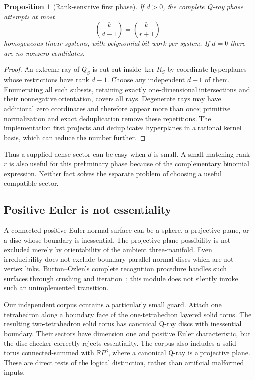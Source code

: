 \documentclass[11pt]{article}
\newtheorem{proposition}[theorem]{Proposition}
\theoremstyle{definition}
\theoremstyle{remark}
\newcommand{\R}{\mathbb R}
\begin{document}
\begin{proposition}[Rank-sensitive first phase]
\label{prop:qcount}
If $d>0$, the complete Q-ray phase attempts at most
\begin{equation}
 \binom{k}{d-1}=\binom{k}{r+1}
 \label{eq:qwork}
\end{equation}
homogeneous linear systems, with polynomial bit work per system. If $d=0$
there are no nonzero candidates.
\end{proposition}
\begin{proof}
An extreme ray of $Q_S$ is cut out inside $\ker R_S$ by coordinate
hyperplanes whose restrictions have rank $d-1$. Choose any independent
$d-1$ of them. Enumerating all such subsets, retaining exactly one-dimensional
intersections and their nonnegative orientation, covers all rays. Degenerate
rays may have additional zero coordinates and therefore appear more than
once; primitive normalization and exact deduplication remove these repetitions.
The implementation first projects and deduplicates hyperplanes in a rational
kernel basis, which can reduce the number further.
\end{proof}

Thus a supplied dense sector can be easy when $d$ is small. A small matching
rank $r$ is also useful for this preliminary phase because of the complementary
binomial expression. Neither fact solves the separate problem of choosing a
useful compatible sector.

\subsection{Positive Euler is not essentiality}

A connected positive-Euler normal surface can be a sphere, a projective plane,
or a disc whose boundary is inessential. The projective-plane possibility is
not excluded merely by orientability of the ambient three-manifold. Even
irreducibility does not exclude boundary-parallel normal discs which are not
vertex links. Burton--Ozlen's complete recognition procedure handles such
surfaces through crushing and iteration~\cite{burtonozlen2014}; this module
does not silently invoke such an unimplemented transition.

Our independent corpus contains a particularly small guard. Attach one
tetrahedron along a boundary face of the one-tetrahedron layered solid torus.
The resulting two-tetrahedron solid torus has canonical Q-ray discs with
inessential boundary. Their sectors have dimension one and positive Euler
characteristic, but the disc checker correctly rejects essentiality.
The corpus also includes a solid torus connected-summed with $\R P^3$, where
a canonical Q-ray is a projective plane. These are direct tests of the
logical distinction, rather than artificial malformed inputs.
\end{document}

